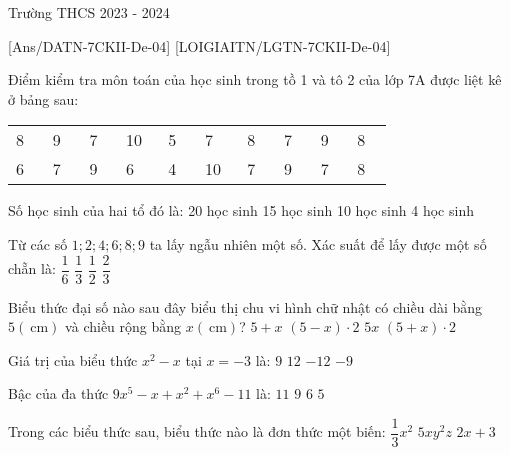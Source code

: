 \begin{name}{Trường THCS  }{2023 - 2024}
\end{name}
[Ans/DATN-7CKII-De-04]
{}
[LOIGIAITN/LGTN-7CKII-De-04]
\begin{ex}
	Điểm kiểm tra môn toán của học sinh trong tồ 1 và tô 2 của lớp 7A được liệt kê ở bảng sau:
	\begin{center}
		\begin{tabular}{|*{10}{C{0.075\linewidth}}|}
			 & 9 & 7 & 10 & 5 & 7 & 8 & 7 & 9 & 8 \\
			6 & 7 & 9 & 6 & 4 & 10 & 7 & 9 & 7 & 8 \\
			\hline
		\end{tabular}
	\end{center}
	Số học sinh của hai tổ đó là:
	\choice
	{20 học sinh}
	{15 học sinh}
	{10 học sinh}
	{4 học sinh}
	\loigiai{}
\end{ex}
\begin{ex}
	Từ các số $1; 2; 4; 6; 8; 9$ ta lấy ngẫu nhiên một số. Xác suất để lấy được một số chẵn là:
	\choice
	{$\dfrac{1}{6}$}
	{$\dfrac{1}{3}$}
	{$\dfrac{1}{2}$}
	{$\dfrac{2}{3}$}
	\loigiai{}
\end{ex}
\begin{ex}
	Biểu thức đại số nào sau đây biểu thị chu vi hình chữ nhật có chiều dài bằng $5(\mathrm{~cm})$ và chiều rộng bằng $x(\mathrm{~cm})$?
	\choice
	{$5+x$}
	{$(5-x) \cdot 2$}
	{$5x$}
	{$(5+x) \cdot 2$}
	\loigiai{}
\end{ex}
\begin{ex}
	Giá trị của biểu thức $x^2-x$ tại $x=-3$ là:
	\choice
	{$9$}
	{$12$}
	{$-12$}
	{$-9$}
	\loigiai{}
\end{ex}
\begin{ex}
	Bậc của đa thức $9x^5-x+x^2+x^6-11$ là:
	\choice
	{$11$}
	{$9$}
	{$6$}
	{$5$}
	\loigiai{}
\end{ex}
\begin{ex}
	Trong các biểu thức sau, biểu thức nào là đơn thức một biến:
		{$\dfrac{1}{3} x^2$}
		{$5x y^2z$}
		{$2x+3$}
	\loigiai{}
\end{ex}
